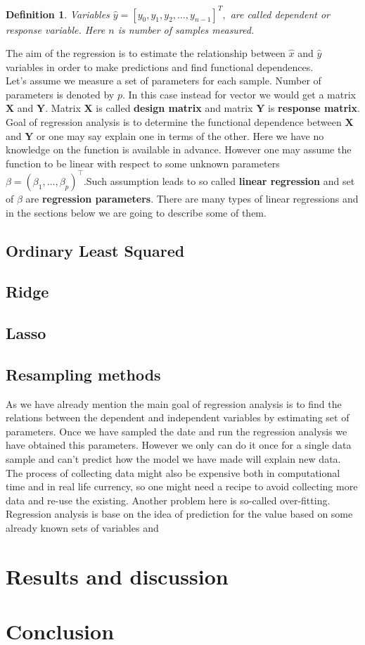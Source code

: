 \documentclass[10pt]{article}
\newtheorem{defn}{Definition}
\begin{document}
\begin{defn}
	Variables  $\hat{y} = [y_0,y_1, y_2,\dots, y_{n-1}]^T,$ are called dependent or response variable. Here $n$ is number of samples measured.
\end{defn}
The aim of the regression is to estimate the relationship between $\hat{x}$ and $\hat{y}$ variables in order to make predictions and find functional dependences. \\
Let's assume we measure a set of parameters for each sample. Number of parameters is denoted by $p$. In this case instead for vector we would get a matrix $\textbf{X}$ and $\textbf{Y}$. Matrix $\textbf{X}$ is called \textbf{design matrix} and matrix $\textbf{Y}$ is \textbf{response matrix}. Goal of regression analysis is to determine the functional dependence between $\textbf{X}$ and $\textbf{Y}$ or one may say explain one in terms of the other. Here we have no knowledge on the function is available in advance. However one may assume the function to be linear with respect to some unknown parameters $\beta = (\beta_1, \ldots, \beta_p)^{\top}$.Such assumption leads to so called \textbf{linear regression} and set of $\beta$  are \textbf{regression parameters}. There are many types of linear regressions and in the sections below we are going to describe some of them.
\subsection{Ordinary Least Squared}

\subsection{Ridge}

\subsection{Lasso}

\subsection{Resampling methods}
As we have already mention the main goal of regression analysis is to find the relations between the dependent and independent variables by estimating set of parameters. Once we have sampled the date and run the regression analysis we have obtained this parameters. However we only can do it once for a single data sample and can't predict how the model we have made will explain new data. The process of collecting data might also be expensive both in computational time and in real life currency, so one might need a recipe to avoid collecting more data and re-use the existing. Another problem here is so-called over-fitting. Regression analysis is base on the idea of prediction for the value based on some already known sets of variables and 


\section{Results and discussion}

\section{Conclusion}
\end{document}
